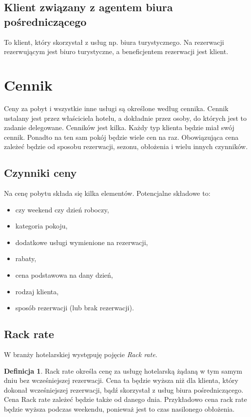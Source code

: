 \documentclass[a4paper,onecolumn,oneside,11pt,wide,floatssmall]{mwrep}
\theoremstyle{definition}
\newtheorem{defn}{Definicja}[section]
\theoremstyle{plain}%
\theoremstyle{remark}
\begin{document}
\subsection{Klient związany z agentem biura pośredniczącego}
To klient, który skorzystał z usług np. biura turystycznego. Na rezerwacji 
rezerwującym jest biuro turystyczne, a beneficjentem rezerwacji jest klient.

\section{Cennik}
Ceny za pobyt i wszystkie inne usługi są określone według cennika. Cennik 
ustalany jest przez właściciela hotelu, a dokładnie przez osoby, do których 
jest to zadanie delegowane. Cenników jest kilka. Każdy typ klienta będzie 
miał swój cennik. Ponadto na ten sam pokój będzie wiele cen na raz. 
Obowiązująca cena zależeć będzie od sposobu rezerwacji, sezonu, obłożenia i 
wielu innych czynników.

\subsection{Czynniki ceny}
Na cenę pobytu składa się kilka elementów. Potencjalne składowe to:
\begin{itemize}
  \item czy weekend czy dzień roboczy,
  \item kategoria pokoju,
  \item dodatkowe usługi wymienione na rezerwacji,
  \item rabaty,
  \item cena podstawowa na dany dzień,
  \item rodzaj klienta,
  \item sposób rezerwacji (lub brak rezerwacji).
\end{itemize}

\subsection{Rack rate}
W branży hotelarskiej występuję pojęcie \emph{Rack rate}.

\begin{defn}{Rack rate}
określa cenę za usługę hotelarską żądaną w tym samym dniu bez wcześniejszej 
rezerwacji. Cena ta będzie wyższa niż dla klienta, który dokonał 
wcześniejszej rezerwacji, bądź skorzystał z usług biura pośredniczącego. 
Cena Rack rate zależeć będzie także od danego dnia. Przykładowo cena rack 
rate będzie wyższa podczas weekendu, ponieważ jest to czas nasilonego 
obłożenia.
\end{defn}
\end{document}
